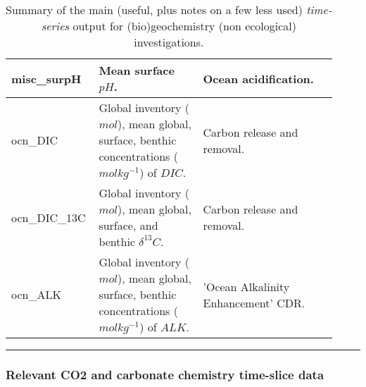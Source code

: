 \begin{table}[ht!]
\begin{tabular}{p{0.2\linewidth} p{0.317\linewidth} p{0.4\linewidth}}
\midrule

\textsf{\footnotesize misc\_surpH} & \small{Mean surface \(pH\).} & \small{Ocean acidification.}\\

\midrule

\textsf{\footnotesize ocn\_DIC} & \small{Global inventory (\(mol\)), mean global,  surface,  benthic concentrations (\(molkg^{-1}\)) of \(DIC\).} & \small{Carbon release and removal.}\\
\textsf{\footnotesize ocn\_DIC\_13C} & \small{Global inventory (\(mol\)), mean global,  surface, and  benthic \(\delta^{13}C\).} & \small{Carbon release and removal.}\\
\textsf{\footnotesize ocn\_ALK} & \small{Global inventory (\(mol\)), mean global,  surface,  benthic concentrations (\(molkg^{-1}\)) of \(ALK\).} & \small{'Ocean Alkalinity Enhancement' CDR.}\\

\bottomrule
\end{tabular}
\caption{Summary of the main (useful, plus notes on a few less used) \textit{time-series} output for (bio)geochemistry (non ecological) investigations.}
\end{table}

\vspace{1mm} \noindent\rule{4cm}{0.1mm} \vspace{2mm}

\newpage

\subsubsection{Relevant CO2 and carbonate chemistry time-slice data}

